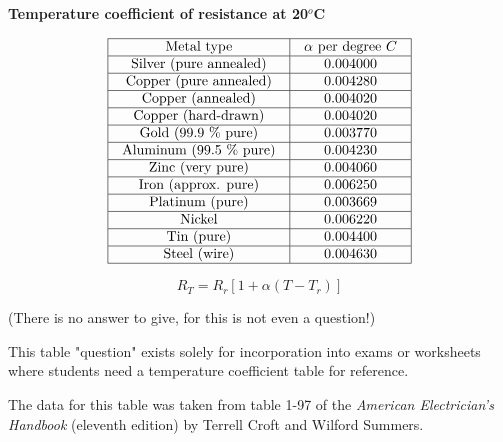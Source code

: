

\centerline{\bf Temperature coefficient of resistance at 20$^{o}$C}


$$\vbox{\offinterlineskip
\halign{\strut
\vrule \quad\hfil # \ \hfil & 
\vrule \quad\hfil # \ \hfil \vrule \cr
\noalign{\hrule}
%
Metal type & $\alpha$ per degree $C$ \cr
%
\noalign{\hrule}
%
Silver (pure annealed) & 0.004000 \cr
%
\noalign{\hrule}
%
Copper (pure annealed) & 0.004280 \cr
%
\noalign{\hrule}
%
Copper (annealed) & 0.004020 \cr
%
\noalign{\hrule}
%
Copper (hard-drawn) & 0.004020 \cr
%
\noalign{\hrule}
%
Gold (99.9 \% pure) & 0.003770 \cr
%
\noalign{\hrule}
%
Aluminum (99.5 \% pure) & 0.004230 \cr
%
\noalign{\hrule}
%
Zinc (very pure) & 0.004060 \cr
%
\noalign{\hrule}
%
Iron (approx. pure) & 0.006250 \cr
%
\noalign{\hrule}
%
Platinum (pure) & 0.003669 \cr
%
\noalign{\hrule}
%
Nickel & 0.006220 \cr
%
\noalign{\hrule}
%
Tin (pure) & 0.004400 \cr
%
\noalign{\hrule}
%
Steel (wire) & 0.004630 \cr
%
\noalign{\hrule}
} %
}$$ %

$$R_T = R_r [ 1 + \alpha (T - T_r)]$$







(There is no answer to give, for this is not even a question!)







This table "question" exists solely for incorporation into exams or worksheets where students need a temperature coefficient table for reference.

The data for this table was taken from table 1-97 of the {\it American Electrician's Handbook} (eleventh edition) by Terrell Croft and Wilford Summers.




